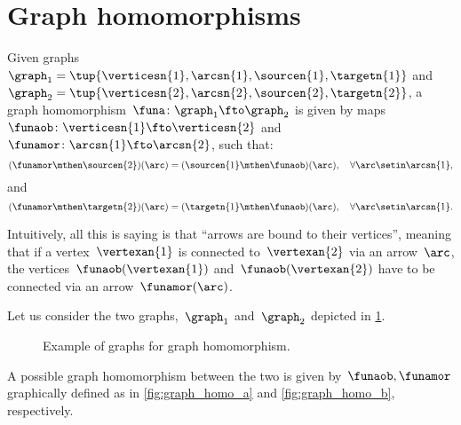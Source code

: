 
\section{Graph homomorphisms}
\begin{definition}
    \label{def:graph_homom}
    Given graphs~$\graph_1=\tup{\verticesn{1},\arcsn{1},\sourcen{1},\targetn{1}}$ and~$\graph_2=\tup{\verticesn{2},\arcsn{2},\sourcen{2},\targetn{2}}$, a graph homomorphism~$\funa \colon \graph_1 \fto \graph_2$ is given by maps~$\funaob\colon \verticesn{1} \fto \verticesn{2}$ and~$\funamor\colon \arcsn{1} \fto \arcsn{2}$, such that:
    \begin{equation*}
        (\funamor \mthen \sourcen{2})(\arc)
        =(\sourcen{1}\mthen \funaob)(\arc), \quad \forall \arc\setin \arcsn{1},
    \end{equation*}
    and
    \begin{equation*}
        (\funamor \mthen \targetn{2})(\arc)
        =(\targetn{1}\mthen \funaob)(\arc), \quad \forall \arc\setin \arcsn{1}.
    \end{equation*}
\end{definition}

\begin{remark}
    Intuitively, all this is saying is that ``arrows are bound to their vertices'', meaning that if a vertex~$\vertexan{1}$ is connected to~$\vertexan{2}$ via an arrow~$\arc$, the vertices~$\funaob(\vertexan{1})$ and~$\funaob(\vertexan{2})$ have to be connected via an arrow~$\funamor(\arc)$.
\end{remark}

\begin{example}
    \label{exa:homomorphism_graph_positive}
    Let us consider the two graphs,~$\graph_1$ and~$\graph_2$ depicted in \cref{fig:ex_graph_homom}.
    \begin{figure}[h]
        \centering
        \caption{Example of graphs for graph homomorphism.}
        \label{fig:ex_graph_homom}
    \end{figure}

    \begin{marginfigure}
        \centering
        \caption{}
        \label{fig:graph_homo_a}
    \end{marginfigure}

    \begin{marginfigure}
        \centering
        \caption{}
        \label{fig:graph_homo_b}
    \end{marginfigure}
    A possible graph homomorphism between the two is given by~$\funaob,\funamor$ graphically defined as in \cref{fig:graph_homo_a} and \cref{fig:graph_homo_b}, respectively.
\end{example}

